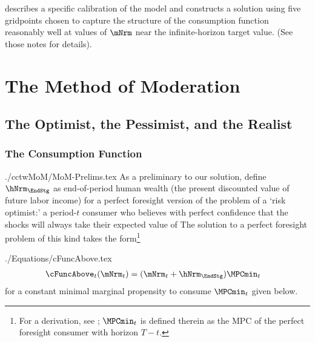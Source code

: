 \documentclass[titlepage, headings=optiontotocandhead]{econtex}
\begin{document}
\cite{SolvingMicroDSOPs} describes a specific calibration of the model and constructs a solution using five gridpoints chosen to capture the structure of the consumption function reasonably well at values of $\mNrm$ near the infinite-horizon target value.  (See those notes for details).



\hypertarget{the-method-of-moderation}{}
\section{The Method of Moderation}

\hypertarget{the-optimist-the-pessimist-and-the-realist}{}
\subsection{The Optimist, the Pessimist, and the Realist}

\hypertarget{the-consumption-function}{}
\subsubsection{The Consumption Function}

\begin{verbatimwrite}{./cctwMoM/MoM-Prelims.tex}
  As a preliminary to our solution, define $\hNrm_{\EndStg}$ as end-of-period human wealth (the present discounted value of future labor income) for a perfect foresight version of the problem of a `risk optimist:' a period-$t$ consumer who believes with perfect confidence that the shocks will always take their expected value of   The solution to a perfect foresight problem of this kind takes the form\footnote{For a derivation, see \cite{BufferStockTheory}; $\MPCmin_{t}$ is defined therein as the MPC of the perfect foresight consumer with horizon $T-t$.}
\end{verbatimwrite}
\unskip
\begin{verbatimwrite}{./Equations/cFuncAbove.tex}
  \begin{equation}\begin{gathered}\begin{aligned}
        \cFuncAbove_{t}(\mNrm_{t})  & = (\mNrm_{t} + \hNrm_{\EndStg})\MPCmin_{t} \label{eq:cFuncAbove}
      \end{aligned}\end{gathered}\end{equation}
  for a constant minimal marginal propensity to consume $\MPCmin_{t}$ given below.
\end{verbatimwrite}
\unskip
\end{document}
